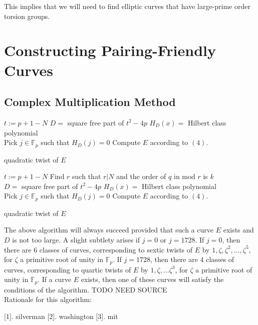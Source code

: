 \documentclass[12pt,twoside]{article}
\begin{document}
This implies that we will need to find elliptic curves that have large-prime order torsion groups. 




\section{Constructing Pairing-Friendly Curves} 

\subsection{Complex Multiplication Method} 

\begin{algorithm}[H]
 $t := p+1 - N$\; 
 $D = $ square free part of $t^2-4p$\;
 $H_D(x) = $ Hilbert class polynomial \\
 Pick $j \in \mathbb F_p$ such that $H_D(j) = 0$
 Compute $E$ according to $(4)$.
 
  {
 }
 {\Return quadratic twist of $E$}
 \end{algorithm}
 \bigskip
 
 
\begin{algorithm}[H]
 $t := p+1 - N$\; 
 Find $r$ such that $r | N$ and the order of $q$ in $\textrm{mod  } r$ is $k$ \\
 $D = $ square free part of $t^2-4p$\;
 $H_D(x) = $ Hilbert class polynomial \\
 Pick $j \in \mathbb F_p$ such that $H_D(j) = 0$
 Compute $E$ according to $(4)$.
 
  {
 }
 {\Return quadratic twist of $E$}
 \end{algorithm}
 \bigskip 
 
 
 
 
 
 
 
 
\noindent The above algorithm will always succeed provided that such a curve $E$ exists and $D$ is not too large. A slight subtlety arises if $j = 0$ or $j = 1728$. If $j = 0$, then there are $6$ classes of curves, corresponding to sextic twists of $E$ by $1, \zeta, \zeta^2, \dots, \zeta^5$, for $\zeta$ a primitive root of unity in $\mathbb F_p$. If $j = 1728$, then there are $4$ classes of curves, corresponding to quartic twists of $E$ by $1, \zeta, \dots \zeta^3$, for $\zeta$ a primitive root of unity in $\mathbb F_p$. If a curve $E$ exists, then one of these curves will satisfy the conditions of the algorithm. TODO NEED SOURCE
\\ 
Rationale for this algorithm: 










 

[1]. silverman
[2]. washington
[3]. mit
\end{document}
